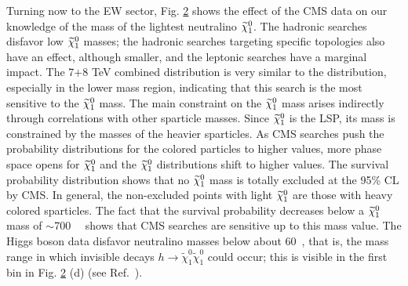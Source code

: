 \begin{figure}[t]
    \vspace{1mm}
    \caption{}
    \label{fig:mt1}
\end{figure}

Turning now to the EW sector, 
Fig. \ref{fig:mz1} shows the effect of the CMS data on our knowledge of the
mass of the lightest neutralino $\widetilde{\chi}^0_1$.  The hadronic 
searches disfavor low $\widetilde{\chi}^0_1$ masses; the hadronic
searches targeting specific topologies also have an effect, although
smaller, and the leptonic searches have a marginal impact.  The
7$+$8 TeV combined distribution is very similar to the \MTtwo{}
distribution, especially in the lower mass region, indicating that this search is the most sensitive to the
$\widetilde{\chi}^0_1$ mass.  The main constraint 
on the $\widetilde{\chi}^0_1$ mass arises indirectly through correlations with other sparticle masses.  Since $\widetilde{\chi}^0_1$ is
the LSP, its mass is constrained by the masses of
the heavier sparticles.  As CMS searches push the probability
distributions for the colored particles to higher values, more phase
space opens for $\widetilde{\chi}^0_1$ and the $\widetilde{\chi}^0_1$ distributions shift to higher
values.  The survival probability distribution shows that no $\widetilde{\chi}^0_1$
mass is totally excluded at the 95\% CL by CMS.  In general, the non-excluded points with light $\widetilde{\chi}^0_1$ are those with heavy colored sparticles.  The fact that the survival probability decreases below a $\widetilde{\chi}^0_1$ mass of $\sim$700~\GeV~ shows that CMS searches are sensitive up to this mass value.
The Higgs boson data disfavor neutralino masses below about 60~\GeV, that is,
the mass range in which invisible decays
$h\to\tilde\chi^0_1\tilde\chi^0_1$ could occur; this is visible in the
first bin in Fig. \ref{fig:mz1} (d) (see Ref.~\cite{Bernon:2014vta}).

\begin{figure}[t]
    \vspace{1mm}
    \caption{}
    \label{fig:mz1}
\end{figure}


